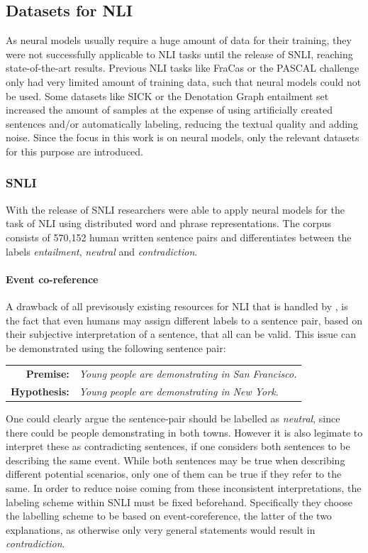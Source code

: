 \subsection{Datasets for NLI}\label{sec:basics_datasets}
As neural models usually require a huge amount of data for their training, they were not successfully applicable to \ac{NLI} tasks until the release of \ac{SNLI}, reaching state-of-the-art results. Previous \ac{NLI} tasks like FraCas \citep{cooper1996using} or the PASCAL challenge \citep{dagan2006pascal} only had very limited amount of training data, such that neural models could not be used. Some datasets like \ac{SICK} \citep{marelli2014semeval} or the Denotation Graph entailment set \citep{young2014image} increased the amount of samples at the expense of using artificially created sentences and/or automatically labeling, reducing the textual quality and adding noise. Since the focus in this work is on neural models, only the relevant datasets for this purpose are introduced.
\subsubsection{SNLI}
With the release of \ac{SNLI} \citep{bowman2015large} researchers were able to apply neural models for the task of \ac{NLI} using distributed word and phrase representations. The corpus consists of 570,152 human written sentence pairs and differentiates between the labels \textit{entailment}, \textit{neutral} and \textit{contradiction}. 
\paragraph*{Event co-reference}
A drawback of all previsously existing resources for \ac{NLI} that is handled by \cite{bowman2015large}, is the fact that even humans may assign different labels to a sentence pair, based on their subjective interpretation of a sentence, that all can be valid. This issue can be demonstrated using the following sentence pair:
\begin{center}
\begin{tabular}{rl}
\textbf{Premise:} & \textit{Young people are demonstrating in San Francisco.}
\\
\textbf{Hypothesis:} & \textit{Young people are demonstrating in New York.}
\end{tabular}
\end{center}
One could clearly argue the sentence-pair should be labelled as \textit{neutral}, since there could be people demonstrating in both towns. However it is also legimate to interpret these as contradicting sentences, if one considers both sentences to be describing the same event. While both sentences may be true when describing different potential scenarios, only one of them can be true if they refer to the same. In order to reduce noise coming from these inconsistent interpretations, the labeling scheme within \ac{SNLI} must be fixed beforehand. Specifically they choose the labelling scheme to be based on event-coreference, the latter of the two explanations, as otherwise only very general statements would result in \textit{contradiction}.
